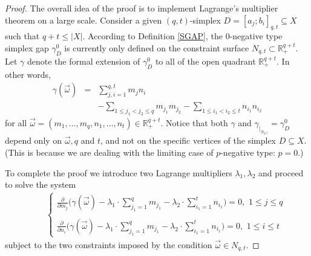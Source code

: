 \documentclass[10pt]{amsart}
\theoremstyle{definition}
\theoremstyle{remark}
\begin{document}
\begin{proof}
The overall idea of the proof is to implement Lagrange's multiplier theorem on a large scale.
Consider a given $(q,t)$-simplex $D=[a_{j};b_{i}]_{q,t} \subseteq X$ such that $q+t \leq |X|$.
According to Definition \ref{SGAP}, the $0$-negative type simplex gap $\gamma_{D}^{0}$ is currently
only defined on the constraint surface $N_{q,t} \subset \mathbb{R}_{+}^{q+t}$. Let $\gamma$ denote
the formal extension of $\gamma_{D}^{0}$ to all of the open quadrant $\mathbb{R}_{+}^{q+t}$. In
other words,
\begin{eqnarray*}
\gamma(\vec{\omega}) & = & \sum\limits_{j,i = 1}^{q,t} m_{j}n_{i} \\
& ~ & - \sum\limits_{1 \leq j_{1} < j_{2} \leq q} m_{j_{1}}m_{j_{2}}
- \sum\limits_{1 \leq i_{1} < i_{2} \leq t} n_{i_{1}}n_{i_{2}}
\end{eqnarray*}
for all $\vec{\omega}=(m_{1}, \ldots, m_{q}, n_{1}, \ldots, n_{t}) \in \mathbb{R}_{+}^{q+t}$.
Notice that both $\gamma$ and $\gamma_{|_{N_{q,t}}} = \gamma_{D}^{0}$ depend only on $\vec{\omega}, q$ and $t$,
and not on the specific vertices of the simplex $D \subseteq X$. (This is because we are dealing with the
limiting case of $p$-negative type: $p=0$.)

To complete the proof we introduce two Lagrange multipliers $\lambda_{1}, \lambda_{2}$ and proceed to solve the
system
\begin{eqnarray}\label{FIVE}
~ & ~ &
\left\{ \begin{array}{c}
\frac{\partial}{\partial m_{j}} \biggl( \gamma(\vec{\omega}) -
\lambda_{1} \cdot \sum\limits_{j_{1}=1}^{q} m_{j_{1}} - \lambda_{2} \cdot
\sum\limits_{i_{1}=1}^{t} n_{i_{1}} \biggl) = 0, \,\, 1 \leq j \leq q \\
~ \\
\frac{\partial}{\partial n_{i}} \biggl( \gamma(\vec{\omega}) -
\lambda_{1} \cdot \sum\limits_{j_{1}=1}^{q} m_{j_{1}} - \lambda_{2} \cdot
\sum\limits_{i_{1}=1}^{t} n_{i_{1}} \biggl) = 0, \,\, 1 \leq i \leq t
\end{array} \right.
\end{eqnarray}
subject to the two constraints imposed by the condition $\vec{\omega} \in N_{q,t}$.


\end{proof}
\end{document}
